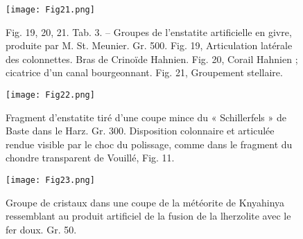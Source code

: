 \documentclass[a4paper, 12pt, oneside, french]{article}
\begin{document}
\clearpage
\begin{figure}[b]
\centering
\texttt{[image: Fig21.png]}
\caption{Fig. 19, 20, 21. Tab. 3. – Groupes de l'enstatite artificielle en givre, produite par M. St. Meunier. Gr. 500. Fig. 19, Articulation latérale des colonnettes. Bras de Crinoïde Hahnien. Fig. 20, Corail Hahnien ; cicatrice d'un canal bourgeonnant. Fig. 21, Groupement stellaire.}
\end{figure}
\clearpage
\begin{figure}[b]
\centering
\texttt{[image: Fig22.png]}
\caption{Fragment d'enstatite tiré d'une coupe mince du « Schillerfels » de Baste dans le Harz. Gr. 300. Disposition colonnaire et articulée rendue visible par le choc du polissage, comme dans le fragment du chondre transparent de Vouillé, Fig. 11.}
\end{figure}
\clearpage
\begin{figure}[b]
\texttt{[image: Fig23.png]}
\caption{Groupe de cristaux dans une coupe de la météorite de Knyahinya ressemblant au produit artificiel de la fusion de la lherzolite avec le fer doux. Gr. 50.}
\centering
\end{figure}
\clearpage
\end{document}
